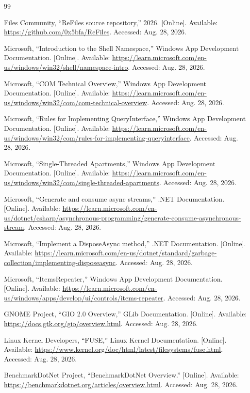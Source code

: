 \documentclass[10pt,a4paper,twoside]{article}
\begin{document}
\begin{thebibliography}{99}
\footnotesize
\raggedright
\setlength{\itemsep}{0.25em}

Files Community, ``ReFiles source repository,'' 2026. [Online]. Available:
\url{https://github.com/0x5bfa/ReFiles}. Accessed: Aug. 28, 2026.

Microsoft, ``Introduction to the Shell Namespace,'' Windows App Development Documentation. [Online]. Available:
\url{https://learn.microsoft.com/en-us/windows/win32/shell/namespace-intro}. Accessed: Aug. 28, 2026.

Microsoft, ``COM Technical Overview,'' Windows App Development Documentation. [Online]. Available:
\url{https://learn.microsoft.com/en-us/windows/win32/com/com-technical-overview}. Accessed: Aug. 28, 2026.

Microsoft, ``Rules for Implementing QueryInterface,'' Windows App Development Documentation. [Online]. Available:
\url{https://learn.microsoft.com/en-us/windows/win32/com/rules-for-implementing-queryinterface}. Accessed: Aug. 28, 2026.

Microsoft, ``Single-Threaded Apartments,'' Windows App Development Documentation. [Online]. Available:
\url{https://learn.microsoft.com/en-us/windows/win32/com/single-threaded-apartments}. Accessed: Aug. 28, 2026.

Microsoft, ``Generate and consume async streams,'' .NET Documentation. [Online]. Available:
\url{https://learn.microsoft.com/en-us/dotnet/csharp/asynchronous-programming/generate-consume-asynchronous-stream}.
Accessed: Aug. 28, 2026.

Microsoft, ``Implement a DisposeAsync method,'' .NET Documentation. [Online]. Available:
\url{https://learn.microsoft.com/en-us/dotnet/standard/garbage-collection/implementing-disposeasync}.
Accessed: Aug. 28, 2026.

Microsoft, ``ItemsRepeater,'' Windows App Development Documentation. [Online]. Available:
\url{https://learn.microsoft.com/en-us/windows/apps/develop/ui/controls/items-repeater}. Accessed: Aug. 28, 2026.

GNOME Project, ``GIO 2.0 Overview,'' GLib Documentation. [Online]. Available:
\url{https://docs.gtk.org/gio/overview.html}. Accessed: Aug. 28, 2026.

Linux Kernel Developers, ``FUSE,'' Linux Kernel Documentation. [Online]. Available:
\url{https://www.kernel.org/doc/html/latest/filesystems/fuse.html}. Accessed: Aug. 28, 2026.

BenchmarkDotNet Project, ``BenchmarkDotNet Overview.'' [Online]. Available:
\url{https://benchmarkdotnet.org/articles/overview.html}. Accessed: Aug. 28, 2026.

\end{thebibliography}
\end{document}
